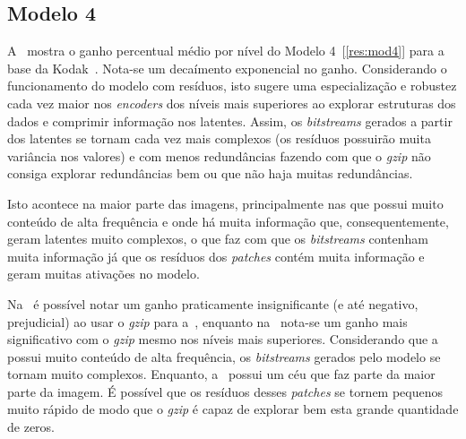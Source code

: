 \subsection{Modelo 4}
A~ mostra o ganho percentual médio por nível do Modelo 4~[\ref{res:mod4}] para a base da Kodak~\cite{kodak}. Nota-se um decaímento exponencial no ganho. Considerando o funcionamento do modelo com resíduos, isto sugere uma especialização e robustez cada vez maior nos \textit{encoders} dos níveis mais superiores ao explorar estruturas dos dados e comprimir informação nos latentes. Assim, os \textit{bitstreams} gerados a partir dos latentes se tornam cada vez mais complexos (os resíduos possuirão muita variância nos valores) e com menos redundâncias fazendo com que o \textit{gzip} não consiga explorar redundâncias bem ou que não haja muitas redundâncias. 

Isto acontece na maior parte das imagens, principalmente nas que possui muito conteúdo de alta frequência e onde há muita informação que, consequentemente, geram latentes muito complexos, o que faz com que os \textit{bitstreams} contenham muita informação já que os resíduos dos \textit{patches} contém muita informação e geram muitas ativações no modelo.


Na~ é possível notar um ganho praticamente insignificante (e até negativo, prejudicial) ao usar o \textit{gzip} para a~, enquanto na~ nota-se um ganho mais significativo com o \textit{gzip} mesmo nos níveis mais superiores. Considerando que a~ possui muito conteúdo de alta frequência, os \textit{bitstreams} gerados pelo modelo se tornam muito complexos. Enquanto, a~ possui um céu que faz parte da maior parte da imagem. É possível que os resíduos desses \textit{patches} se tornem pequenos muito rápido de modo que o \textit{gzip} é capaz de explorar bem esta grande quantidade de zeros.

